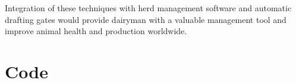 \documentclass[11pt]{article}
\begin{document}
	Integration of these techniques with herd management software and automatic drafting gates would provide dairyman with a valuable management tool and improve animal health and production worldwide.

	\newpage

\section{Code}
	

\newpage


\end{document}
